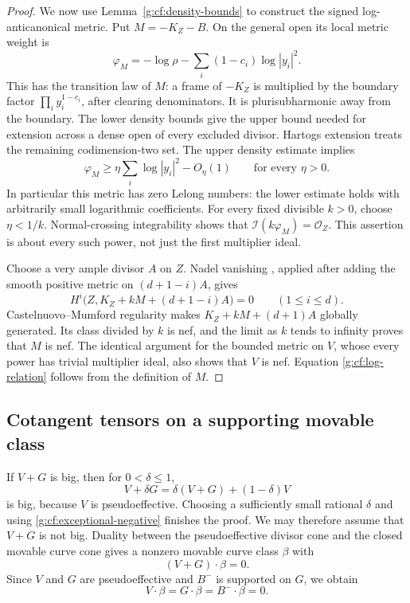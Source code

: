 \begin{proof}
We now use Lemma~\ref{g:cf:density-bounds} to construct the signed
log-anticanonical metric. Put $M=-K_Z-B$.  On the general open its local metric weight is
\begin{equation}\label{g:cf:corrected-weight}
 \varphi_M=-\log\rho-\sum_i(1-c_i)\log|y_i|^2.
\end{equation}
This has the transition law of $M$: a frame of $-K_Z$ is
multiplied by the boundary factor $\prod_i y_i^{1-c_i}$,
after clearing denominators.  It is plurisubharmonic away
from the boundary.  The lower density bounds give the upper
bound needed for extension across a dense open of every
excluded divisor.  Hartogs extension treats the remaining
codimension-two set.  The upper density estimate implies
\begin{equation}\label{g:cf:arbitrarily-small-poles}
 \varphi_M\geq\eta\sum_i\log|y_i|^2-O_\eta(1)
 \qquad\text{for every }\eta>0.
\end{equation}
In particular this metric has zero Lelong numbers: the lower estimate
holds with arbitrarily small logarithmic coefficients. For every fixed
divisible $k>0$, choose $\eta<1/k$.
Normal-crossing integrability shows that
$\mathcal I(k\varphi_M)=\mathcal O_Z$.  This assertion is
about every such power, not just the first multiplier ideal.

Choose a very ample divisor $A$ on $Z$.  Nadel vanishing
\cite{Nadel}, applied after adding the smooth positive metric
on $(d+1-i)A$, gives
\[
 H^i\bigl(Z,K_Z+kM+(d+1-i)A\bigr)=0
 \qquad(1\leq i\leq d).
\]
Castelnuovo--Mumford regularity makes
$K_Z+kM+(d+1)A$ globally generated.  Its class divided by $k$
is nef, and the limit as $k$ tends to infinity proves that
$M$ is nef.  The identical argument for the bounded metric
on $V$, whose every power has trivial multiplier ideal,
also shows that $V$ is nef.  Equation
\eqref{g:cf:log-relation} follows from the definition of $M$.
\end{proof}

\subsection{Cotangent tensors on a supporting movable class}
\label{g:cf:slopes}

If $V+G$ is big, then for $0<\delta\leq1$,
\[
 V+\delta G=\delta(V+G)+(1-\delta)V
\]
is big, because $V$ is pseudoeffective.  Choosing a sufficiently
small rational $\delta$ and using
\eqref{g:cf:exceptional-negative} finishes the proof.  We may
therefore assume that $V+G$ is not big.  Duality between the
pseudoeffective divisor cone and the closed movable curve cone
\cite{BDPP2013} gives a nonzero movable curve class $\beta$ with
\[
 (V+G)\cdot\beta=0.
\]
Since $V$ and $G$ are pseudoeffective and $B^-$ is supported
on $G$, we obtain
\begin{equation}\label{g:cf:null-degrees}
 V\cdot\beta=G\cdot\beta=B^-\cdot\beta=0.
\end{equation}

